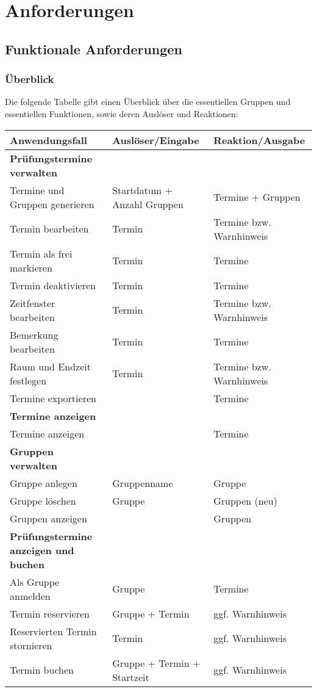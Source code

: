 \section{Anforderungen}

\subsection{Funktionale Anforderungen}

\subsubsection{Überblick}
Die folgende Tabelle gibt einen Überblick über die essentiellen Gruppen
und essentiellen Funktionen, sowie deren Auslöser und Reaktionen:

\begin{tabular}{ | l | l | l | }
  \hline
  Anwendungsfall & Auslöser/Eingabe & Reaktion/Ausgabe \\
  \hline
  \textbf{Prüfungstermine verwalten} & & \\
  Termine und Gruppen generieren & Startdatum + Anzahl Gruppen & Termine + Gruppen \\
  Termin bearbeiten & Termin & Termine bzw. Warnhinweis \\
  Termin als frei markieren & Termin & Termine \\
  Termin deaktivieren & Termin & Termine \\
  Zeitfenster bearbeiten & Termin & Termine bzw. Warnhinweis \\
  Bemerkung bearbeiten & Termin & Termine \\
  Raum und Endzeit festlegen & Termin & Termine bzw. Warnhinweis \\
  Termine exportieren &  & Termine \\
  \textbf{Termine anzeigen} &  &  \\
  Termine anzeigen &  & Termine \\
  \textbf{Gruppen verwalten} &  &  \\
  Gruppe anlegen & Gruppenname & Gruppe \\
  Gruppe löschen & Gruppe & Gruppen (neu) \\
  Gruppen anzeigen &  & Gruppen \\
  \textbf{Prüfungstermine anzeigen und buchen} &  &  \\
  Als Gruppe anmelden & Gruppe & Termine \\
  Termin reservieren & Gruppe + Termin & ggf. Warnhinweis \\
  Reservierten Termin stornieren & Termin & ggf. Warnhinweis \\
  Termin buchen & Gruppe + Termin + Startzeit & ggf. Warnhinweis \\
  \hline
\end{tabular}

